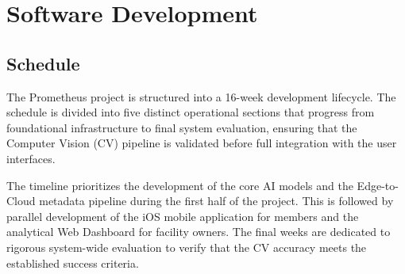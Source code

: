 \chapter{Software Development}
\label{chap:software-development}




\section{Schedule}
\label{section:schedule}

The Prometheus project is structured into a 16-week development lifecycle. The schedule is divided into five distinct operational sections that progress from foundational infrastructure to final system evaluation, ensuring that the Computer Vision (CV) pipeline is validated before full integration with the user interfaces.

The timeline prioritizes the development of the core AI models and the Edge-to-Cloud metadata pipeline during the first half of the project. This is followed by parallel development of the iOS mobile application for members and the analytical Web Dashboard for facility owners. The final weeks are dedicated to rigorous system-wide evaluation to verify that the CV accuracy meets the established success criteria.

